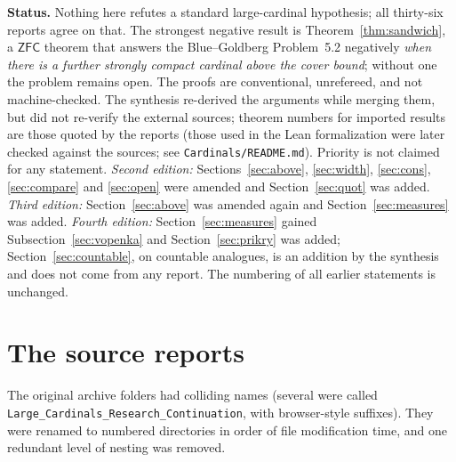 \documentclass[11pt,letterpaper]{article}
\theoremstyle{definition}
\numberwithin{equation}{section}
\newcommand{\ZFC}{\mathsf{ZFC}}
\begin{document}
\textbf{Status.} Nothing here refutes a standard large-cardinal hypothesis; all thirty-six reports agree on that. The strongest negative result is Theorem~\ref{thm:sandwich}, a $\ZFC$ theorem that answers the Blue--Goldberg Problem~5.2 negatively \emph{when there is a further strongly compact cardinal above the cover bound}; without one the problem remains open. The proofs are conventional, unrefereed, and not machine-checked. The synthesis re-derived the arguments while merging them, but did not re-verify the external sources; theorem numbers for imported results are those quoted by the reports (those used in the Lean formalization were later checked against the sources; see \nolinkurl{Cardinals/README.md}). Priority is not claimed for any statement. \emph{Second edition:} Sections~\ref{sec:above}, \ref{sec:width}, \ref{sec:cons}, \ref{sec:compare} and \ref{sec:open} were amended and Section~\ref{sec:quot} was added. \emph{Third edition:} Section~\ref{sec:above} was amended again and Section~\ref{sec:measures} was added. \emph{Fourth edition:} Section~\ref{sec:measures} gained Subsection~\ref{sec:vopenka} and Section~\ref{sec:prikry} was added; Section~\ref{sec:countable}, on countable analogues, is an addition by the synthesis and does not come from any report. The numbering of all earlier statements is unchanged.

\newpage
\tableofcontents

\newpage
\section{The source reports}\label{sec:sources}

The original archive folders had colliding names (several were called \nolinkurl{Large_Cardinals_Research_Continuation}, with browser-style suffixes). They were renamed to numbered directories in order of file modification time, and one redundant level of nesting was removed.
\end{document}
